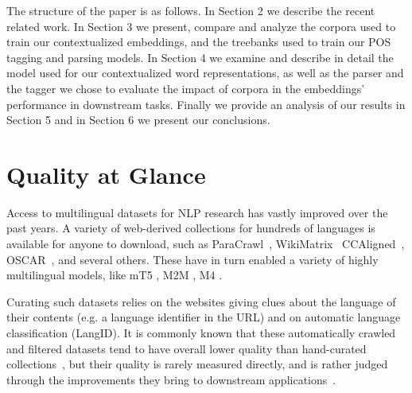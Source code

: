 The  structure  of  the  paper  is  as  follows. In Section 2 we describe the recent related work. In Section 3  we present, compare and analyze the corpora used to train our contextualized embeddings, and the treebanks used to train our POS tagging and parsing models. In Section 4 we examine and describe in detail the model used for our contextualized word representations, as well as the parser and the tagger we chose to evaluate the impact of corpora in the embeddings' performance in downstream tasks. Finally we provide an analysis of our results in Section 5 and in Section 6 we present our conclusions.

\section{Quality at Glance}

Access to multilingual datasets for NLP research has vastly improved over the past years. A variety of web-derived collections for hundreds of languages is available for anyone to download, such as ParaCrawl~\citep{espla-etal-2019-paracrawl, banon-etal-2020-paracrawl}, WikiMatrix~\citep{schwenk-etal-2021-wikimatrix} CCAligned~\citep{el-kishky-etal-2020-ccaligned}, \mbox{OSCAR}~\citep{ortiz-suarez-etal-2019-asynchronous, ortiz-suarez-etal-2020-monolingual}, and several others.
These have in turn enabled a variety of highly multilingual models, like mT5 \citep{xue-etal-2021-mt5}, M2M \citep{fan-etal-2020-beyond}, M4 \citep{arivazhagan-etal-2019-massively}.

Curating such datasets relies on the websites giving clues about the language of their contents (e.g. a language identifier in the URL) and on automatic language classification (LangID).
It is commonly known that these automatically crawled and filtered datasets tend to have overall lower quality than hand-curated collections~\citep{koehn-etal-2020-findings}, but their quality is rarely measured directly, and is rather judged through the improvements they bring to downstream applications~\citep{schwenk-etal-2021-wikimatrix}.

